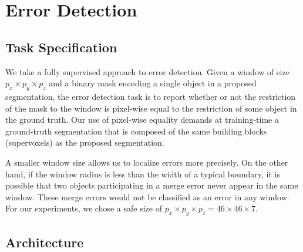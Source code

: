 \documentclass{article}
\begin{document}
\section{Error Detection}
\subsection{Task Specification}
We take a fully supervised approach to error detection. Given a window of size $p_x\times p_y\times p_z$ and a binary mask encoding a single object in a proposed segmentation, the error detection task is to report whether or not the restriction of the mask to the window is pixel-wise equal to the restriction of some object in the ground truth. Our use of pixel-wise equality demands at training-time a ground-truth segmentation that is composed of the same building blocks (supervoxels) as the proposed segmentation.

A smaller window size allows us to localize errors more precisely. On the other hand, if the window radius is less than the width of a typical boundary, it is possible that two objects participating in a merge error never appear in the same window. These merge errors would not be classified as an error in any window. For our experiments, we chose a safe size of  $p_x\times p_y \times p_z = 46\times 46 \times 7$.


\subsection{Architecture}
\end{document}
